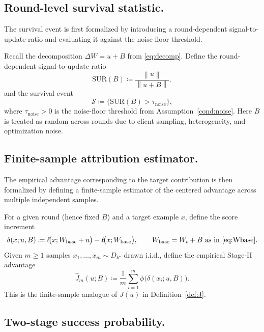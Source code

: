 \documentclass[bdcc,article,submit,pdftex]{Definitions/mdpi}
\newcommand{\norm}[1]{\left\lVert #1 \right\rVert}
\newcommand{\tindex}{k^\star}
\newcommand{\utarget}{u}
\begin{document}
\subsection{Round-level survival statistic.}

The survival event is first formalized by introducing a round-dependent signal-to-update ratio and evaluating it against the noise floor threshold.

Recall the decomposition $\Delta W=\utarget+B$ from \eqref{eq:decomp}.
Define the round-dependent signal-to-update ratio
\begin{equation}
\label{eq:sur_B}
\mathrm{SUR}(B)\coloneqq \frac{\norm{\utarget}}{\norm{\utarget+B}},
\end{equation}
and the survival event
\begin{equation}
\label{eq:event_survival}
\mathcal{S}\coloneqq \{\mathrm{SUR}(B)>\tau_{\mathrm{noise}}\},
\end{equation}
where $\tau_{\mathrm{noise}}>0$ is the noise-floor threshold from Assumption~\ref{cond:noise}.
Here $B$ is treated as random across rounds due to client sampling, heterogeneity, and optimization noise.

\subsection{Finite-sample attribution estimator.}

The empirical advantage corresponding to the target contribution is then formalized by defining a finite-sample estimator of the centered advantage across multiple independent samples.

For a given round (hence fixed $B$) and a target example $x$, define the score increment
\begin{equation}
\label{eq:delta_B}
\delta(x;\utarget,B)\coloneqq \ell\!\big(x;W_{\mathrm{base}}+\utarget\big)-\ell\!\big(x;W_{\mathrm{base}}\big),
\qquad W_{\mathrm{base}}=W_t+B \ \text{as in \eqref{eq:Wbase}}.
\end{equation}
Given $m\ge 1$ samples $x_1,\dots,x_m\sim D_{\tindex}$ drawn i.i.d., define the empirical Stage-II advantage
\begin{equation}
\label{eq:Jhat}
\widehat{J}_m(\utarget;B)
\coloneqq
\frac{1}{m}\sum_{i=1}^m \phi\!\big(\delta(x_i;\utarget,B)\big).
\end{equation}
This is the finite-sample analogue of $J(\utarget)$ in Definition~\ref{def:J}.

\subsection{Two-stage success probability.}
\end{document}
